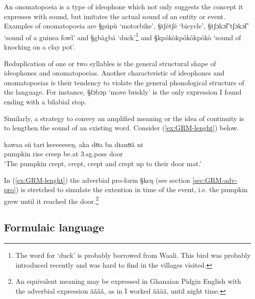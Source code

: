 An onomatopoeia is a type of ideophone which not only suggests the concept  it
expresses with sound, but imitates  the actual sound of an entity or event.
Examples of onomatopoeia are {\S púpù} `motorbike', {\S tʃétʃé} `bicycle',
{\S tʃɔkɔ̃ɪ̃ tʃɔkɔ̃ɪ̃} `sound
of a guinea fowl' and {\S gbàgbá}  `duck'\footnote{The word for `duck' is
probably 
borrowed from Waali.
This bird was probably introduced recently and was hard to find in the
villages
visited.}  and {\S kpókòkpókòkpókò} `sound of knocking on a clay pot'.


Reduplication of one or two syllables is the general structural shape of
ideophones and onomatopoeias. Another characteristic of ideophones and
onomatopoeias  is their
tendency to violate the general
phonological structure of the language.  For instance,  {\S fɔbɔp} `move
briskly'  is the only expression I found ending with a bilabial stop. 

Similarly, a strategy to convey an amplified meaning or the idea of
continuity is to lengthen the sound of an existing word. Consider 
(\ref{ex:GRM-lenght}) below.

\begin{exe}
 \ex\label{ex:GRM-lenght}
   \gll  kawaa sii tarɪ keeeeeeeŋ, aka dʊa  ba dɪanʊã nɪ\\
pumpkin rise {creep} {\advm} {\conn} {be.at} {\sc 3.sg.poss} door {\postp}\\
\glt `The pumpkin crept, crept, crept and crept up to their
door mat.'
\end{exe}

In (\ref{ex:GRM-lenght}) the adverbial pro-form {\S keŋ} (see section
\ref{sec:GRM-adv-pro}) is stretched to simulate the extention in time of the
event, i.e. the pumpkin grew until it reached the door.\footnote{An equivalent
meaning may be expressed in Ghanaian Pidgin English with the adverbial
expression  {\F ãããã}, as in {\F I worked ãããã, until night time.}}


\subsection{Formulaic language}
\label{sec:GRM-greet}


